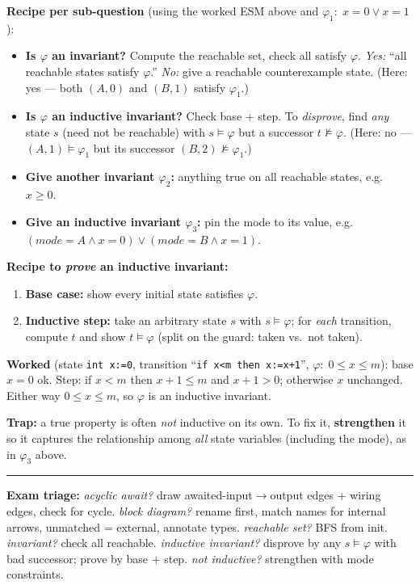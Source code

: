 \textbf{Recipe per sub-question} (using the worked ESM above and
$\varphi_1:\;x=0\lor x=1$):
\begin{itemize}
  \item \textbf{Is $\varphi$ an invariant?} Compute the reachable set, check all
        satisfy $\varphi$. \emph{Yes:} ``all reachable states satisfy $\varphi$.''
        \emph{No:} give a reachable counterexample state.
        (Here: yes --- both $(A,0)$ and $(B,1)$ satisfy $\varphi_1$.)
  \item \textbf{Is $\varphi$ an inductive invariant?} Check base + step. To
        \emph{disprove}, find \emph{any} state $s$ (need not be reachable) with
        $s\models\varphi$ but a successor $t\not\models\varphi$.
        (Here: no --- $(A,1)\models\varphi_1$ but its successor $(B,2)\not\models\varphi_1$.)
  \item \textbf{Give another invariant $\varphi_2$:} anything true on all reachable
        states, e.g.\ $x\ge 0$.
  \item \textbf{Give an inductive invariant $\varphi_3$:} pin the mode to its value,
        e.g.\ $(\mathit{mode}=A\land x=0)\lor(\mathit{mode}=B\land x=1)$.
\end{itemize}

\textbf{Recipe to \emph{prove} an inductive invariant:}
\begin{enumerate}
  \item \textbf{Base case:} show every initial state satisfies $\varphi$.
  \item \textbf{Inductive step:} take an arbitrary state $s$ with $s\models\varphi$;
        for \emph{each} transition, compute $t$ and show $t\models\varphi$
        (split on the guard: taken vs.\ not taken).
\end{enumerate}

\textbf{Worked} (state \texttt{int x:=0}, transition ``\texttt{if x<m then x:=x+1}'',
$\varphi:\;0\le x\le m$): base $x=0$ ok. Step: if $x<m$ then $x{+}1\le m$ and
$x{+}1>0$; otherwise $x$ unchanged. Either way $0\le x\le m$, so $\varphi$ is an
inductive invariant.

\begin{keybox}
\textbf{Trap:} a true property is often \emph{not} inductive on its own. To
fix it, \textbf{strengthen} it so it captures the relationship among \emph{all}
state variables (including the mode), as in $\varphi_3$ above.
\end{keybox}

\vspace{4pt}
\hrule
\vspace{2pt}
{\footnotesize\textbf{Exam triage:} \emph{acyclic await?} draw awaited-input$\to$output edges + wiring edges, check for cycle. \emph{block diagram?} rename first, match names for internal arrows, unmatched = external, annotate types. \emph{reachable set?} BFS from init. \emph{invariant?} check all reachable. \emph{inductive invariant?} disprove by any $s\models\varphi$ with bad successor; prove by base + step. \emph{not inductive?} strengthen with mode constraints.}
